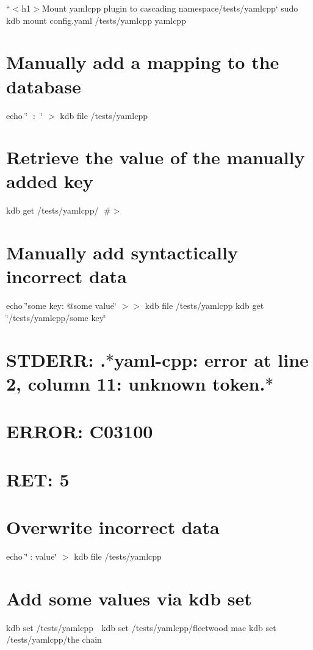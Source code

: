 ``{\ttfamily  $<$h1$>$Mount yamlcpp plugin to cascading namespace}/tests/yamlcpp` sudo kdb mount config.\+yaml /tests/yamlcpp yamlcpp

\section*{Manually add a mapping to the database}

echo \char`\"{}🔑 \+: 🐳\char`\"{} $>$ {\ttfamily kdb file /tests/yamlcpp} \section*{Retrieve the value of the manually added key}

kdb get /tests/yamlcpp/🔑 \#$>$ 🐳

\section*{Manually add syntactically incorrect data}

echo \char`\"{}some key\+: @some  value\char`\"{} $>$$>$ {\ttfamily kdb file /tests/yamlcpp} kdb get \char`\"{}/tests/yamlcpp/some key\char`\"{} \section*{S\+T\+D\+E\+RR\+: .$\ast$yaml-\/cpp\+: error at line 2, column 11\+: unknown token.$\ast$}

\section*{E\+R\+R\+OR\+: C03100}

\section*{R\+ET\+: 5}

\section*{Overwrite incorrect data}

echo \char`\"{}🔑\+: value\char`\"{} $>$ {\ttfamily kdb file /tests/yamlcpp}

\section*{Add some values via {\ttfamily kdb set}}

kdb set /tests/yamlcpp 🎵 kdb set /tests/yamlcpp/fleetwood mac kdb set /tests/yamlcpp/the chain

